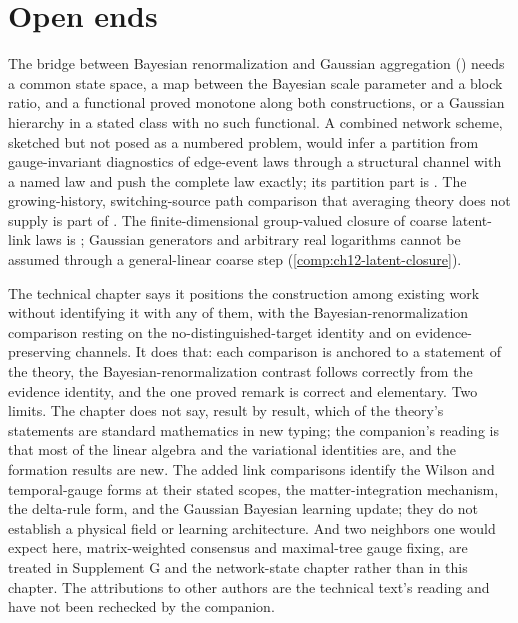 \section{Open ends}
\label{comp:ch15-open}

The bridge between Bayesian renormalization and Gaussian aggregation () needs
a common state space, a map between the Bayesian scale parameter and a block ratio, and a functional
proved monotone along both constructions, or a Gaussian hierarchy in a stated class with no such
functional. A combined network scheme, sketched but not posed as a numbered problem, would infer a
partition from gauge-invariant diagnostics of edge-event laws through a structural channel with a named
law and push the complete law exactly; its partition part is . The
growing-history, switching-source path comparison that averaging theory does not supply is part of
.
The finite-dimensional group-valued closure of coarse latent-link laws is
; Gaussian generators and arbitrary real logarithms cannot be
assumed through a general-linear coarse step (\cref{comp:ch12-latent-closure}).

\begin{verdictbox}{\DELIVERED}
The technical chapter says it positions the construction among existing work without identifying it with
any of them, with the Bayesian-renormalization comparison resting on the no-distinguished-target identity
and on evidence-preserving channels. It does that: each comparison is anchored to a statement of the
theory, the Bayesian-renormalization contrast follows correctly from the evidence identity, and the one
proved remark is correct and elementary. Two limits. The chapter does not say, result by result, which of
the theory's statements are standard mathematics in new typing; the companion's reading is that most of
the linear algebra and the variational identities are, and the formation results are new. The added
link comparisons identify the Wilson and temporal-gauge forms at their stated scopes, the
matter-integration mechanism, the delta-rule form, and the Gaussian Bayesian learning update;
they do not establish a physical field or learning architecture. And two
neighbors one would expect here, matrix-weighted consensus and maximal-tree gauge fixing, are treated in
Supplement G and the network-state chapter rather than in this chapter. The attributions to other
authors are the technical text's reading and have not been rechecked by the companion.
\end{verdictbox}
